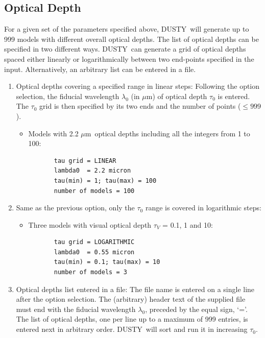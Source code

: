 \documentclass[11pt]{article}
\def\D  {{\sf DUSTY}}
\def\mic    {\hbox{$\mu$m}}
\begin{document}
\subsection{Optical Depth}
\label{optical_depth} For a given set of the parameters specified above, \D\
will generate up to 999 models with different overall optical depths.  The list
of optical depths can be specified in two different ways.  \D\ can generate a
grid of optical depths spaced either linearly or logarithmically between two
end-points specified in the input.  Alternatively, an arbitrary list can be
entered in a file.

\begin{enumerate}

\item Optical depths covering a specified range in linear steps:  Following
    the option selection, the fiducial wavelength $\lambda_0$ (in \mic) of
    optical depth $\tau_0$ is entered.  The $\tau_0$ grid is then specified
    by its two ends and the number of points ($\le 999$).

\begin{itemize}
\item Models with 2.2 \mic\ optical depths including all the integers
    from 1 to 100:

\begin{verbatim}
       tau grid = LINEAR
       lambda0  = 2.2 micron
       tau(min) = 1; tau(max) = 100
       number of models = 100
\end{verbatim}
\end{itemize}

\item Same as the previous option, only the $\tau_0$ range is covered in
    logarithmic steps:

\begin{itemize}
\item Three models with visual optical depth $\tau_V$ =  0.1, 1 and 10:
\begin{verbatim}
       tau grid = LOGARITHMIC
       lambda0  = 0.55 micron
       tau(min) = 0.1; tau(max) = 10
       number of models = 3
\end{verbatim}
\end{itemize}

\item Optical depths list entered in a file: The file name is entered on a
    single line after the option selection. The (arbitrary) header text of
    the supplied file must end with the fiducial wavelength $\lambda_0$,
    preceded by the equal sign, `='. The list of optical depths, one per
    line up to a maximum of 999 entries, is entered next in arbitrary
    order.  \D\ will sort and run it in increasing $\tau_0$.


\end{enumerate}
\end{document}
